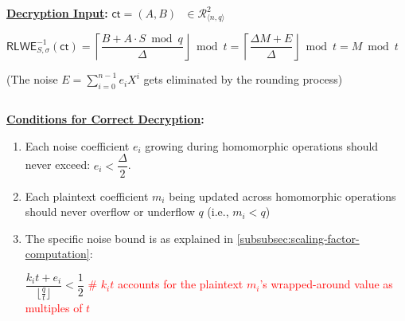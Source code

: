 \begin{tcolorbox}[title={\textbf{\tboxlabel{\ref*{subsec:bfv-enc-dec}} BFV Encryption and Decryption}}]
\textbf{\underline{Decryption Input}:} $\textsf{ct} = (A, B) \text{ } \in \mathcal{R}_{\langle n,q \rangle}^2$ 

$\textsf{RLWE}^{-1}_{S,\sigma}(\textsf{ct}) = \left\lceil\dfrac{B + A \cdot S \bmod q}{\Delta}\right\rfloor \bmod t = \left\lceil\dfrac{\Delta M + E}{\Delta}\right\rfloor \bmod t = M \bmod t$

(The noise $E = \sum\limits_{i=0}^{n-1}e_iX^i$ gets eliminated by the rounding process) 





$ $

\textbf{\underline{Conditions for Correct Decryption}:}
\begin{enumerate}
\item Each noise coefficient $e_i$ growing during homomorphic operations should never exceed: $e_i < \dfrac{\Delta}{2}$. 

\item Each plaintext coefficient $m_i$ being updated across homomorphic operations should never overflow or underflow $q$ (i.e., $m_i < q$)

\item The specific noise bound is as explained in \autoref{subsubsec:scaling-factor-computation}:

$\dfrac{k_i t + e_i}{\lfloor\frac{q}{t}\rfloor} < \dfrac{1}{2}$ \textcolor{red}{ \# $k_i t$ accounts for the plaintext $m_i$'s wrapped-around value as multiples of $t$}
 
\end{enumerate}

\end{tcolorbox}



